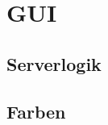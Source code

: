 \documentclass[12pt]{article}
\begin{document}
\newpage
\pagestyle{fancy}
\fancyhead{}
\section{GUI}
\label{gui}

\subsection{Serverlogik}
\label{serverlogik}


\newpage
\pagestyle{fancy}
\fancyhead{}
\subsection{Farben}


\end{document}

